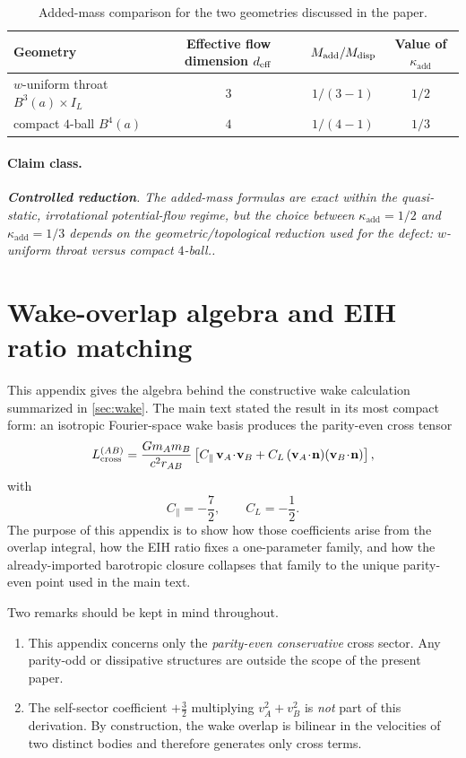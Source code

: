 \documentclass[11pt]{article}
\newcommand{\vct}{\mathbf v}
\newcommand{\nvec}{\mathbf n}
\newcommand{\kadd}{\kappa_{\mathrm{add}}}
\newcommand{\Cpara}{C_{\parallel}}
\newcommand{\CLong}{C_{L}}
\newcommand{\Controlled}{\textbf{Controlled reduction}}
\newcommand{\claimclass}[1]{\paragraph{Claim class.}\emph{#1.}}
\begin{document}
\begin{table}[t]
  \centering
  \caption{Added-mass comparison for the two geometries discussed in the paper.}
  \label{tab:app-added-mass-comparison}
  \small
  \renewcommand{\arraystretch}{1.15}
  \begin{tabularx}{\linewidth}{@{}L c c c@{}}
    \toprule
    Geometry & Effective flow dimension \(d_{\rm eff}\) & \(M_{\rm add}/M_{\rm disp}\) & Value of \(\kadd\) \\
    \midrule
    \(w\)-uniform throat \(B^3(a)\times I_L\) & \(3\) & \(1/(3-1)\) & \(1/2\) \\
    compact \(4\)-ball \(B^4(a)\) & \(4\) & \(1/(4-1)\) & \(1/3\) \\
    \bottomrule
  \end{tabularx}
\end{table}

\claimclass{\Controlled. The added-mass formulas are exact within the quasi-static,
irrotational potential-flow regime, but the choice between \(\kadd=1/2\) and
\(\kadd=1/3\) depends on the geometric/topological reduction used for the defect:
\(w\)-uniform throat versus compact \(4\)-ball.}

\section{Wake-overlap algebra and EIH ratio matching}
\label{app:wake}

This appendix gives the algebra behind the constructive wake calculation summarized in
\cref{sec:wake}. The main text stated the result in its most compact form:
an isotropic Fourier-space wake basis produces the parity-even cross tensor
\begin{equation}
L_{\rm cross}^{(AB)}
=
\frac{Gm_A m_B}{c^2 r_{AB}}
\left[
\Cpara\,\vct_A\!\cdot\!\vct_B
+
\CLong\,(\vct_A\!\cdot\!\nvec)(\vct_B\!\cdot\!\nvec)
\right],
\end{equation}
with
\begin{equation}
\Cpara=-\frac72,
\qquad
\CLong=-\frac12.
\end{equation}
The purpose of this appendix is to show how those coefficients arise from the overlap
integral, how the EIH ratio fixes a one-parameter family, and how the already-imported
barotropic closure collapses that family to the unique parity-even point used in the main
text.

Two remarks should be kept in mind throughout.
\begin{enumerate}[leftmargin=1.5em]
  \item This appendix concerns only the \emph{parity-even conservative} cross sector.
  Any parity-odd or dissipative structures are outside the scope of the present paper.
  \item The self-sector coefficient \(+\frac32\) multiplying \(v_A^2+v_B^2\) is
  \emph{not} part of this derivation. By construction, the wake overlap is bilinear in the
  velocities of two distinct bodies and therefore generates only cross terms.
\end{enumerate}
\end{document}
